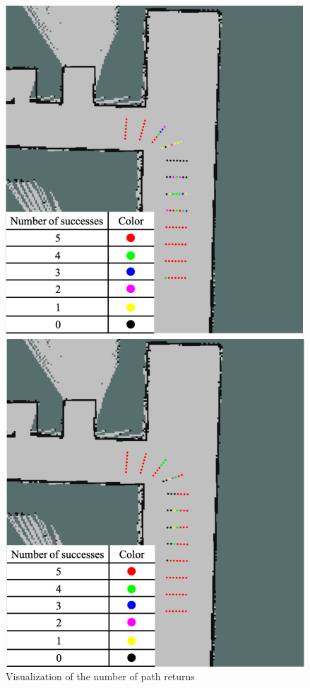 \documentclass{jarticle}
\begin{document}
\begin{figure}[htbp]
  \begin{minipage}[t]{0.5\linewidth}
    \centering
    \includegraphics[keepaspectratio, scale=0.24]{figs/a.png}
  \end{minipage}
  \begin{minipage}[t]{0.5\linewidth}
    \centering
    \includegraphics[keepaspectratio, scale=0.24]{figs/b.png}
  \end{minipage}\vspace*{2mm}
  \caption{Visualization of the number of path returns}
\end{figure}
\end{document}
